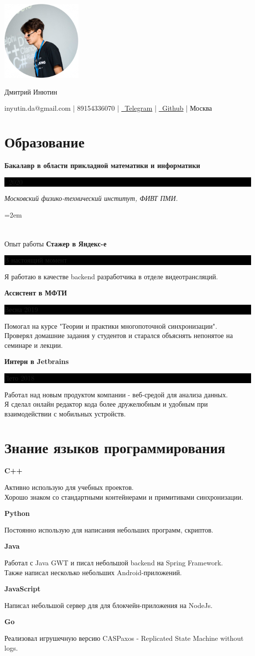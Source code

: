 \documentclass[fontsize=11pt]{article}
\newcommand{\MyName}[1]{ %
    \Huge \centering #1
    \par \normalsize \normalfont}
\newcommand{\NewPart}[1]{\section*{#1}}
\newcommand{\ProgrammingEntry}[2]{
    \noindent \textbf{#1} \hfill      %

    \noindent \small #2 %
    \normalsize \par}
\newcommand{\EducationEntry}[4]{
    \noindent \textbf{#1} \hfill      %
    \colorbox{Black}{
      \parbox{10em}{
      \color{White} \centering #2}} \par   %
    \noindent \textit{#3} \par        %
    \noindent\hangindent=2em\hangafter=0 \small #4 %
    \normalsize \par}
\newcommand{\WorkEntry}[3]{       %
    \noindent \large \textbf{#1} \hfill      %
    \colorbox{Black}{%
      \parbox{10em}{%
      \color{White} \centering #2}} \par  %
    \noindent \small #3 %
    \normalsize \par}
\begin{document}
\begin{minipage}{0.2\textwidth}%
\includegraphics[width=4cm]{me.png}
\end{minipage}%
\hfill%
\begin{minipage}{14cm}\raggedright
\bigskip
\bigskip
\bigskip
\bigskip
\bigskip
\bigskip
\MyName{Дмитрий Инютин}
\bigskip
{inyutin.da@gmail.com | 89154336070 | \href{https://t.me/inyutin}{\faTelegram \, Telegram} | \href{https://github.com/inyutin}{\faGithub \, Github} | Москва}
\end{minipage}



\NewPart{Образование}{}
\EducationEntry
{Бакалавр в области прикладной математики и информатики}
{2016 - 2020}
{Московский физико-технический институт, ФИВТ ПМИ.}

\NewPart{Опыт работы}{}
\WorkEntry
{Стажер в Яндекс-е}
{В настоящий момент}
{Я работаю в качестве backend разработчика в отделе видеотрансляций.}

\bigskip

\WorkEntry
{Ассистент в МФТИ}
{Весна 2019}
{Помогал на курсе "Теории и практики многопоточной синхронизации". \\ Проверял домашние задания у студентов и старался объяснять непонятое на семинаре и лекции.}

\bigskip

\WorkEntry
{Интерн в Jetbrains}
{Лето 2018}
{Работал над новым продуктом компании - веб-средой для анализа данных. \\ Я сделал онлайн редактор кода более дружелюбным и удобным при взаимодействии с мобильных устройств.}

\NewPart{Знание языков программирования}{}
\ProgrammingEntry
{C++ \bigstar \bigstar \bigstar}
{Активно использую для учебных проектов. \\ Хорошо знаком со стандартными контейнерами и примитивами синхронизации.}
\bigskip
\ProgrammingEntry
{Python \bigstar \bigstar \bigstar}
{Постоянно использую для написания небольших программ, скриптов.}
\bigskip
\ProgrammingEntry
{Java \bigstar \bigstar}
{Работал с Java GWT и писал небольшой backend на Spring Framework. \\
Также написал несколько небольших Android-приложений.}
\bigskip
\ProgrammingEntry
{JavaScript \bigstar \bigstar}
{Написал небольшой сервер для для блокчейн-приложения на NodeJs.}
\bigskip
\ProgrammingEntry
{Go \bigstar}
{Реализовал игрушечную версию CASPaxos - Replicated State Machine without logs.}
\end{document}
